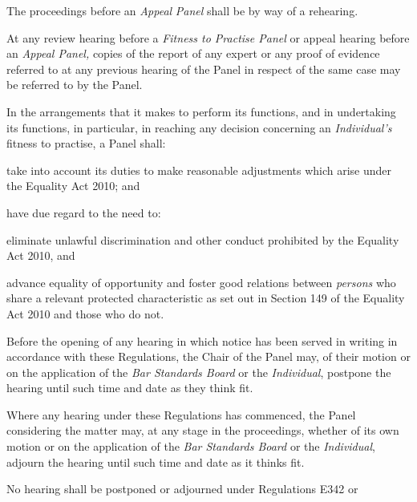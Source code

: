\par
The proceedings before an \emph{Appeal} \emph{Panel} shall be by way of
a rehearing.\\
\par
At any review hearing before a \emph{Fitness to Practise Panel} or
appeal hearing before an \emph{Appeal Panel,} copies of the report of
any expert or any proof of evidence referred to at any previous hearing
of the Panel in respect of the same case may be referred to by the
Panel.\\
\par
In the arrangements that it makes to perform its functions, and in
undertaking its functions, in particular, in reaching any decision
concerning an \emph{ Individual's} fitness to practise, a Panel shall:\\\nl \item take into account its duties to make reasonable adjustments which
arise under the Equality Act 2010; and\item have due regard to the need to:\al
\item  eliminate unlawful discrimination and other conduct prohibited by the
Equality Act 2010, and\\
\item  advance equality of opportunity and foster good relations
between \emph{persons} who share a relevant protected characteristic as
set out in Section 149 of the Equality Act 2010 and those who do not.\la\ln
{}\par
{}
Before the opening of any hearing in which notice has been served in
writing in accordance with these Regulations, the Chair of the Panel
may, of their motion or on the application of the \emph{Bar Standards
Board} or the \emph{Individual}, postpone the hearing until such time
and date as they think fit.\\
\par
Where any hearing under these Regulations has commenced, the Panel
considering the matter may, at any stage in the proceedings, whether of
its own motion or on the application of the \emph{Bar Standards
Board} or the \emph{ Individual}, adjourn the hearing until such time
and date as it thinks fit.\\
\par
No hearing shall be postponed or adjourned under Regulations E342 or
